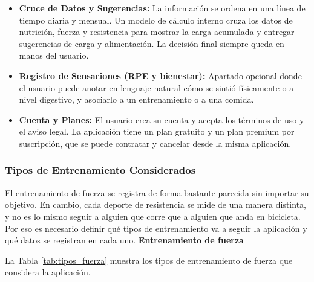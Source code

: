\begin{itemize}
    \item \textbf{Cruce de Datos y Sugerencias:} La información se ordena en una línea de tiempo diaria y mensual. Un modelo de cálculo interno cruza los datos de nutrición, fuerza y resistencia para mostrar la carga acumulada y entregar sugerencias de carga y alimentación. La decisión final siempre queda en manos del usuario.
    \item \textbf{Registro de Sensaciones (RPE y bienestar):} Apartado opcional donde el usuario puede anotar en lenguaje natural cómo se sintió físicamente o a nivel digestivo, y asociarlo a un entrenamiento o a una comida.
    \item \textbf{Cuenta y Planes:} El usuario crea su cuenta y acepta los términos de uso y el aviso legal. La aplicación tiene un plan gratuito y un plan premium por suscripción, que se puede contratar y cancelar desde la misma aplicación.
\end{itemize}

\subsubsection*{Tipos de Entrenamiento Considerados}
El entrenamiento de fuerza se registra de forma bastante parecida sin importar su objetivo. En cambio, cada deporte de resistencia se mide de una manera distinta, y no es lo mismo seguir a alguien que corre que a alguien que anda en bicicleta. Por eso es necesario definir qué tipos de entrenamiento va a seguir la aplicación y qué datos se registran en cada uno.
\newpage
\textbf{Entrenamiento de fuerza}

La Tabla \ref{tab:tipos_fuerza} muestra los tipos de entrenamiento de fuerza que considera la aplicación.

